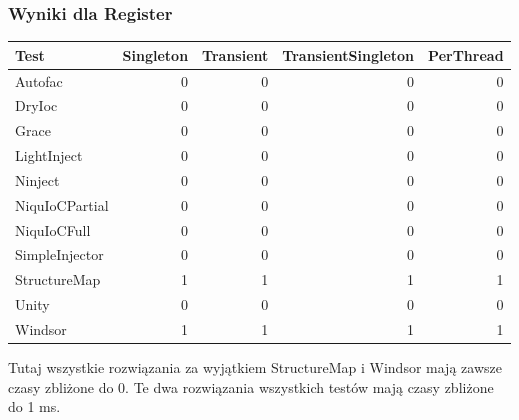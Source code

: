 \documentclass[12pt]{article}
\begin{document}
\subsubsection{Wyniki dla Register}
\begin{center}
\begin{small}
	\begin{tabular}{ | l | r | r | r | r | }
    		\hline
Test & Singleton & Transient & TransientSingleton & PerThread \\ \hline
Autofac & 0 & 0 & 0 & 0 \\ \hline
DryIoc & 0 & 0 & 0 & 0 \\ \hline
Grace & 0 & 0 & 0 & 0 \\ \hline
LightInject & 0 & 0 & 0 & 0 \\ \hline
Ninject & 0 & 0 & 0 & 0 \\ \hline
NiquIoCPartial & 0 & 0 & 0 & 0 \\ \hline
NiquIoCFull & 0 & 0 & 0 & 0 \\ \hline
SimpleInjector & 0 & 0 & 0 & 0 \\ \hline
StructureMap & 1 & 1 & 1 & 1 \\ \hline
Unity & 0 & 0 & 0 & 0 \\ \hline
Windsor & 1 & 1 & 1 & 1 \\ \hline
  	\end{tabular}
\end{small}
\end{center}
Tutaj wszystkie rozwiązania za wyjątkiem StructureMap i Windsor mają zawsze czasy zbliżone do 0. Te dwa rozwiązania wszystkich testów mają czasy zbliżone do 1 ms.
\end{document}
